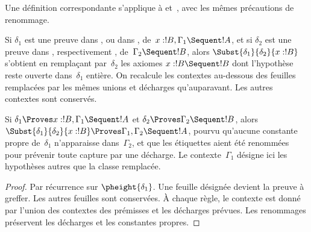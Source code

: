 \documentclass[../../../include/open-logic-section]{subfiles}
\begin{document}
Une définition correspondante s'applique à  et~,
avec les mêmes précautions de renommage.

\begin{defn}
Si $\delta_1$ est une preuve dans , ou dans ,
de~$x:!B, \Gamma_1 \Sequent !A$, et si $\delta_2$ est une preuve
dans , respectivement ,
de~$\Gamma_2 \Sequent !B$, alors
$\Subst{\delta_1}{\delta_2}{x:!B}$ s'obtient en remplaçant
par~$\delta_2$ les axiomes $x:!B \Sequent !B$ dont l'hypothèse
reste ouverte dans~$\delta_1$ entière. On recalcule les contextes
au-dessous des feuilles remplacées par les mêmes unions et décharges
qu'auparavant. Les autres contextes sont conservés.
\end{defn}

\begin{prop}
Si $\delta_1 \Proves x:!B, \Gamma_1 \Sequent !A$
et $\delta_2 \Proves \Gamma_2 \Sequent !B$, alors
$\Subst{\delta_1}{\delta_2}{x:!B} \Proves
\Gamma_1, \Gamma_2 \Sequent !A$,
pourvu qu'aucune constante propre de~$\delta_1$ n'apparaisse
dans~$\Gamma_2$, et que les étiquettes aient été renommées
pour prévenir toute capture par une décharge.
Le contexte~$\Gamma_1$ désigne ici les hypothèses autres que
la classe remplacée.
\end{prop}

\begin{proof}
Par récurrence sur $\pheight{\delta_1}$.
Une feuille désignée devient la preuve à greffer. Les autres
feuilles sont conservées. À chaque règle, le contexte est donné
par l'union des contextes des prémisses et les décharges prévues.
Les renommages préservent les décharges et les constantes propres.
\end{proof}
\end{document}
